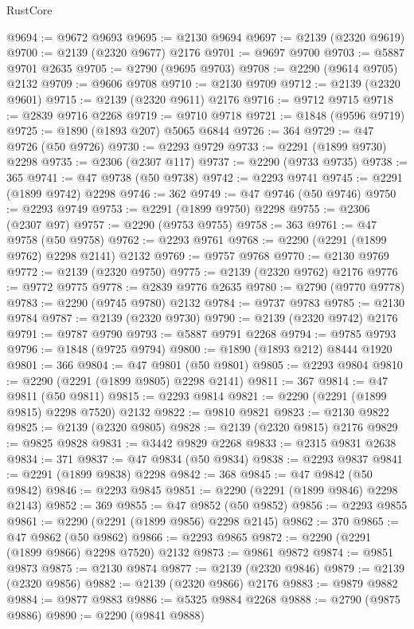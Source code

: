 \begin{lexlean}{RustCore}
\begin{coremodule}
@9694 := @9672 @9693
@9695 := @2130 @9694
@9697 := @2139 (@2320 @9619)
@9700 := @2139 (@2320 @9677) @2176
@9701 := @9697 @9700
@9703 := @5887 @9701 @2635
@9705 := @2790 (@9695 @9703)
@9708 := @2290 (@9614 @9705) @2132
@9709 := @9606 @9708
@9710 := @2130 @9709
@9712 := @2139 (@2320 @9601)
@9715 := @2139 (@2320 @9611) @2176
@9716 := @9712 @9715
@9718 := @2839 @9716 @2268
@9719 := @9710 @9718
@9721 := @1848 (@9596 @9719)
@9725 := @1890 (@1893 @207) @5065 @6844
@9726 := 364
@9729 := @47 @9726 (@50 @9726)
@9730 := @2293 @9729
@9733 := @2291 (@1899 @9730) @2298
@9735 := @2306 (@2307 @117)
@9737 := @2290 (@9733 @9735)
@9738 := 365
@9741 := @47 @9738 (@50 @9738)
@9742 := @2293 @9741
@9745 := @2291 (@1899 @9742) @2298
@9746 := 362
@9749 := @47 @9746 (@50 @9746)
@9750 := @2293 @9749
@9753 := @2291 (@1899 @9750) @2298
@9755 := @2306 (@2307 @97)
@9757 := @2290 (@9753 @9755)
@9758 := 363
@9761 := @47 @9758 (@50 @9758)
@9762 := @2293 @9761
@9768 := @2290 (@2291 (@1899 @9762) @2298 @2141) @2132
@9769 := @9757 @9768
@9770 := @2130 @9769
@9772 := @2139 (@2320 @9750)
@9775 := @2139 (@2320 @9762) @2176
@9776 := @9772 @9775
@9778 := @2839 @9776 @2635
@9780 := @2790 (@9770 @9778)
@9783 := @2290 (@9745 @9780) @2132
@9784 := @9737 @9783
@9785 := @2130 @9784
@9787 := @2139 (@2320 @9730)
@9790 := @2139 (@2320 @9742) @2176
@9791 := @9787 @9790
@9793 := @5887 @9791 @2268
@9794 := @9785 @9793
@9796 := @1848 (@9725 @9794)
@9800 := @1890 (@1893 @212) @8444 @1920
@9801 := 366
@9804 := @47 @9801 (@50 @9801)
@9805 := @2293 @9804
@9810 := @2290 (@2291 (@1899 @9805) @2298 @2141)
@9811 := 367
@9814 := @47 @9811 (@50 @9811)
@9815 := @2293 @9814
@9821 := @2290 (@2291 (@1899 @9815) @2298 @7520) @2132
@9822 := @9810 @9821
@9823 := @2130 @9822
@9825 := @2139 (@2320 @9805)
@9828 := @2139 (@2320 @9815) @2176
@9829 := @9825 @9828
@9831 := @3442 @9829 @2268
@9833 := @2315 @9831 @2638
@9834 := 371
@9837 := @47 @9834 (@50 @9834)
@9838 := @2293 @9837
@9841 := @2291 (@1899 @9838) @2298
@9842 := 368
@9845 := @47 @9842 (@50 @9842)
@9846 := @2293 @9845
@9851 := @2290 (@2291 (@1899 @9846) @2298 @2143)
@9852 := 369
@9855 := @47 @9852 (@50 @9852)
@9856 := @2293 @9855
@9861 := @2290 (@2291 (@1899 @9856) @2298 @2145)
@9862 := 370
@9865 := @47 @9862 (@50 @9862)
@9866 := @2293 @9865
@9872 := @2290 (@2291 (@1899 @9866) @2298 @7520) @2132
@9873 := @9861 @9872
@9874 := @9851 @9873
@9875 := @2130 @9874
@9877 := @2139 (@2320 @9846)
@9879 := @2139 (@2320 @9856)
@9882 := @2139 (@2320 @9866) @2176
@9883 := @9879 @9882
@9884 := @9877 @9883
@9886 := @5325 @9884 @2268
@9888 := @2790 (@9875 @9886)
@9890 := @2290 (@9841 @9888)

\end{coremodule}
\end{lexlean}
